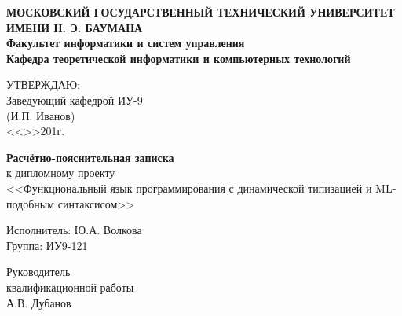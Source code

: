 
\thispagestyle{empty}
\newpage
{
\centering


\textbf{
МОСКОВСКИЙ ГОСУДАРСТВЕННЫЙ ТЕХНИЧЕСКИЙ УНИВЕРСИТЕТ ИМЕНИ Н. Э. БАУМАНА \\
Факультет информатики и систем управления \\
Кафедра теоретической информатики и компьютерных технологий}

\vfill

\hfill\parbox{7cm} {
УТВЕРЖДАЮ:\\
Заведующий кафедрой ИУ-9 \hfill \\
\underline{\hspace{4cm}}(И.П. Иванов)\hfill \\
<<\underline{\hspace{0.5cm}}>>\underline{\hspace{3cm}}201\underline{\hspace{0.5cm}}г.\hfill \\
}

\bigskip
\bigskip
\bigskip
\bigskip
\bigskip
\bigskip
\bigskip
\bigskip

\vfill

{\large\bf Расчётно-пояснительная записка} \\
к дипломному проекту \\
<<Функциональный язык программирования с динамической типизацией и ML-подобным синтаксисом>>

\vfill

\hfill\parbox{7cm} {
Исполнитель: Ю.А. Волкова \\
Группа: ИУ9-121
}

\bigskip
\bigskip
\bigskip
\bigskip
\bigskip
\bigskip
\bigskip

\vfill

Руководитель \\
квалификационной работы \\
А.В. Дубанов

\vspace{\fill}
}

\clearpage